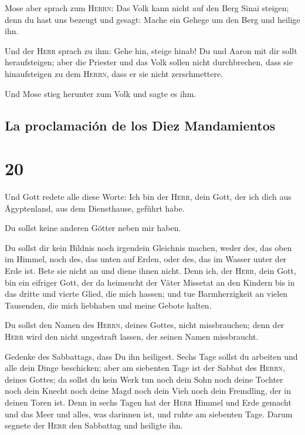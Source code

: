 Mose aber sprach zum \textsc{Herrn}: Das Volk kann nicht
auf den Berg Sinai steigen; denn du hast uns bezeugt und gesagt: Mache
ein Gehege um den Berg und heilige ihn.

 Und der \textsc{Herr} sprach zu ihm: Gehe hin, steige
hinab! Du und Aaron mit dir sollt heraufsteigen; aber die Priester und
das Volk sollen nicht durchbrechen, dass sie hinaufsteigen zu dem
\textsc{Herrn}, dass er sie nicht zerschmettere.

 Und Mose stieg herunter zum Volk und sagte es ihm.

\hypertarget{la-proclamaciuxf3n-de-los-diez-mandamientos}{%
\subsection{La proclamación de los Diez
Mandamientos}\label{la-proclamaciuxf3n-de-los-diez-mandamientos}}

\hypertarget{section-19}{%
\section{20}\label{section-19}}

 Und Gott redete alle diese Worte:  Ich bin
der \textsc{Herr}, dein Gott, der ich dich aus Ägyptenland, aus dem
Diensthause, geführt habe.

 Du sollst keine anderen Götter neben mir haben.

 Du sollst dir kein Bildnis noch irgendein Gleichnis
machen, weder des, das oben im Himmel, noch des, das unten auf Erden,
oder des, das im Wasser unter der Erde ist.  Bete sie
nicht an und diene ihnen nicht. Denn ich, der \textsc{Herr}, dein Gott,
bin ein eifriger Gott, der da heimsucht der Väter Missetat an den
Kindern bis in das dritte und vierte Glied, die mich hassen;
 und tue Barmherzigkeit an vielen Tausenden, die mich
liebhaben und meine Gebote halten.

 Du sollst den Namen des \textsc{Herrn}, deines Gottes,
nicht missbrauchen; denn der \textsc{Herr} wird den nicht ungestraft
lassen, der seinen Namen missbraucht.

 Gedenke des Sabbattags, dass Du ihn heiligest.
 Sechs Tage sollst du arbeiten und alle dein Dinge
beschicken;  aber am siebenten Tage ist der Sabbat des
\textsc{Herrn}, deines Gottes; da sollst du kein Werk tun noch dein Sohn
noch deine Tochter noch dein Knecht noch deine Magd noch dein Vieh noch
dein Fremdling, der in deinen Toren ist.  Denn in sechs
Tagen hat der \textsc{Herr} Himmel und Erde gemacht und das Meer und
alles, was darinnen ist, und ruhte am siebenten Tage. Darum segnete der
\textsc{Herr} den Sabbattag und heiligte ihn.

